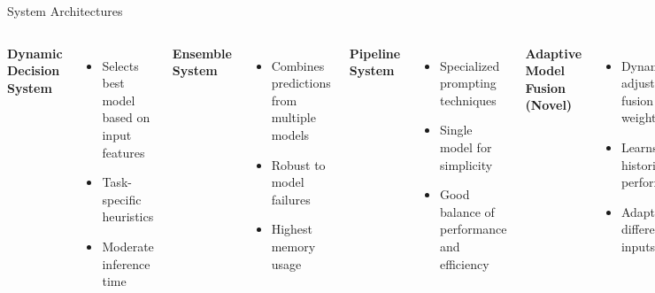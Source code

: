 \documentclass{beamer}
\begin{document}
\begin{frame}{System Architectures}
\begin{columns}[T]
\textbf{Dynamic Decision System}
\begin{itemize}
    \item Selects best model based on input features
    \item Task-specific heuristics
    \item Moderate inference time
\end{itemize}

\textbf{Ensemble System}
\begin{itemize}
    \item Combines predictions from multiple models
    \item Robust to model failures
    \item Highest memory usage
\end{itemize}
\textbf{Pipeline System}
\begin{itemize}
    \item Specialized prompting techniques
    \item Single model for simplicity
    \item Good balance of performance and efficiency
\end{itemize}

\textbf{Adaptive Model Fusion (Novel)}
\begin{itemize}
    \item Dynamically adjusts fusion weights
    \item Learns from historical performance
    \item Adapts to different inputs
\end{itemize}
\end{columns}
\end{frame}
\end{document}
